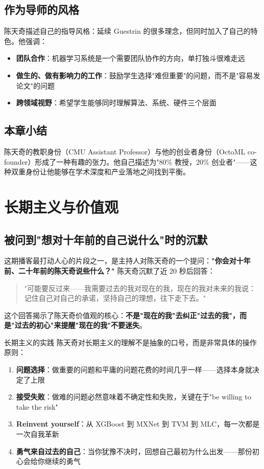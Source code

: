 \documentclass[a4paper]{article}
\begin{document}
\subsection{作为导师的风格}

陈天奇描述自己的指导风格：延续 Guestrin 的很多理念，但同时加入了自己的特色。他强调：

\begin{itemize}
\item \textbf{团队合作}：机器学习系统是一个需要团队协作的方向，单打独斗很难走远
\item \textbf{做生的、做有影响力的工作}：鼓励学生选择"难但重要"的问题，而不是"容易发论文"的问题
\item \textbf{跨领域视野}：希望学生能够同时理解算法、系统、硬件三个层面
\end{itemize}

\subsection{本章小结}

陈天奇的教职身份（CMU Assistant Professor）与他的创业者身份（OctoML co-founder）形成了一种有趣的张力。他自己描述为"80\% 教授，20\% 创业者"——这种双重身份让他能够在学术深度和产业落地之间找到平衡。

\section{长期主义与价值观}

\subsection{被问到"想对十年前的自己说什么"时的沉默}

这期播客最打动人心的片段之一，是主持人对陈天奇的一个提问：\textbf{"你会对十年前、二十年前的陈天奇说些什么？"} 陈天奇沉默了近 20 秒后回答：

\begin{quote}
"可能要反过来——我需要过去的我对现在的我，现在的我对未来的我说：记住自己对自己的承诺，坚持自己的理想，往下走下去。"
\end{quote}

这个回答揭示了陈天奇价值观的核心：\textbf{不是"现在的我"去纠正"过去的我"，而是"过去的初心"来提醒"现在的我"不要迷失}。

\begin{importantbox}{长期主义的实践}
陈天奇对长期主义的理解不是抽象的口号，而是非常具体的操作原则：
\begin{enumerate}
\item \textbf{问题选择}：做重要的问题和平庸的问题花费的时间几乎一样——选择本身就决定了上限
\item \textbf{接受失败}：做难的问题必然意味着不确定性和失败，关键在于"be willing to take the risk"
\item \textbf{Reinvent yourself}：从 XGBoost 到 MXNet 到 TVM 到 MLC，每一次都是一次自我革新
\item \textbf{勇气来自过去的自己}：当你犹豫不决时，回想自己最初为什么出发——那份初心会给你继续的勇气
\end{enumerate}
\end{importantbox}
\end{document}
